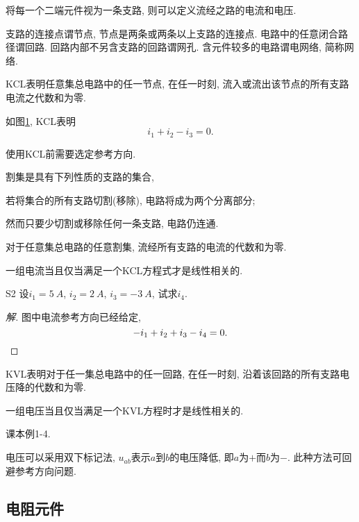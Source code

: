 \documentclass{ctexart}
\begin{document}
将每一个二端元件视为一条支路, 则可以定义流经之路的电流和电压.
\par
支路的连接点谓节点, 节点是两条或两条以上支路的连接点. 电路中的任意闭合路径谓回路. 回路内部不另含支路的回路谓网孔. 含元件较多的电路谓电网络, 简称网络.
\par
KCL表明任意集总电路中的任一节点, 在任一时刻, 流入或流出该节点的所有支路电流之代数和为零.
\begin{figure}[ht]
    \centering
    \caption{}
    \label{fig:KCL例1}
\end{figure}
\begin{sample}
    \begin{ex}
        如图\cref{fig:KCL例1}, KCL表明
        \[ i_1 + i_2 - i_3 = 0. \]
    \end{ex}
\end{sample}
使用KCL前需要选定参考方向.
\par
割集是具有下列性质的支路的集合,
\begin{cenum}
    \item 若将集合的所有支路切割(移除), 电路将成为两个分离部分;
    \item 然而只要少切割或移除任何一条支路, 电路仍连通.
\end{cenum}
对于任意集总电路的任意割集, 流经所有支路的电流的代数和为零.
\par
一组电流当且仅当满足一个KCL方程式才是线性相关的.
\begin{sample}
    \begin{ex}
        S2 设$i_1=\SI{5}{A}$, $i_2 = \SI{2}{A}$, $i_3 = \SI{-3}{A}$, 试求$i_4$.
    \end{ex}
    \begin{proof}[解]
        图中电流参考方向已经给定,
        \[ -i_1 + i_2 + i_3 - i_4 = 0. \qedhere \]
    \end{proof}
\end{sample}
KVL表明对于任一集总电路中的任一回路, 在任一时刻, 沿着该回路的所有支路电压降的代数和为零.
\par
一组电压当且仅当满足一个KVL方程时才是线性相关的.
\begin{sample}
    \begin{ex}
        课本例1-4.
    \end{ex}
\end{sample}
电压可以采用双下标记法, $u_{ab}$表示$a$到$b$的电压降低, 即$a$为$+$而$b$为$-$. 此种方法可回避参考方向问题.


\subsection{电阻元件} %
\label{sub:电阻元件}
\end{document}
